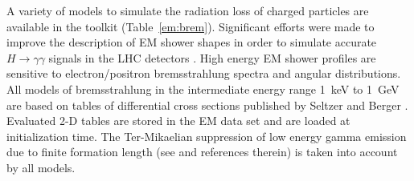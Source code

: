 A variety of models to simulate the radiation loss of charged particles are
available in the toolkit (Table~\ref{em:brem}).  Significant efforts were made
\cite{embib:chep12} to improve the description of EM shower shapes in order to
simulate accurate $H\to\gamma\gamma$ signals in the LHC detectors 
\cite{embib:Higgs1,embib:Higgs2}.  High energy EM shower profiles are sensitive 
to electron/positron bremsstrahlung spectra and angular distributions.
All \Gfour{} models of bremsstrahlung in the intermediate energy range 1~keV to
1~GeV are based on tables of differential cross sections published by Seltzer
and Berger \cite{embib:SelzBer}.  Evaluated 2-D tables are stored in the EM 
data set  and are loaded at initialization time.  The 
Ter-Mikaelian suppression of low energy gamma emission due to finite formation 
length (see \cite{embib:bremfl} and references therein) is taken into account 
by all models. 

